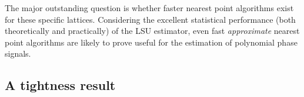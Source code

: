 \documentclass[journal]{IEEEtran}
\begin{document}
The major outstanding question is whether faster nearest point algorithms exist for these specific lattices.  Considering the excellent statistical performance (both theoretically and practically) of the LSU estimator, even fast \emph{approximate} nearest point algorithms are likely to prove useful for the estimation of polynomial phase signals. 
  


 
 
 
% 
 
 
% 
\small 
 


\normalsize
\appendix




\subsection{A tightness result}
\end{document}
